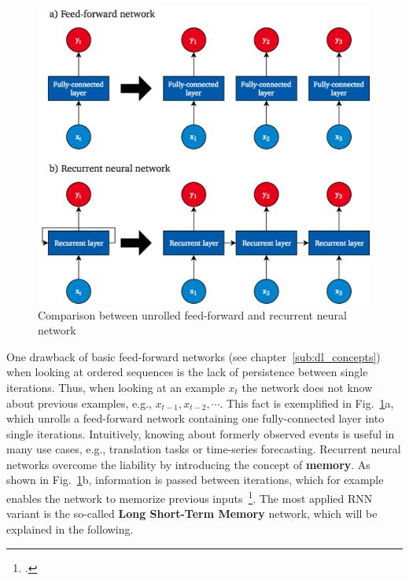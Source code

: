 \begin{figure}[h]
  \includegraphics[height=10cm]{img/rnn_unrolled_2}
  \caption{Comparison between unrolled feed-forward and recurrent neural network}
\label{fig:rnn_unrolled}
\end{figure}

One drawback of basic feed-forward networks (see chapter~\ref{sub:dl_concepts})
when looking at ordered sequences is the lack of persistence between single
iterations.
Thus, when looking at an example $x_t$ the network does not know about previous
examples, e.g., $x_{t-1}, x_{t-2},\cdots$.
This fact is exemplified in Fig.~\ref{fig:rnn_unrolled}a, which unrolls a
feed-forward network containing one fully-connected layer into single iterations.
Intuitively, knowing about formerly observed events is useful in many use cases,
e.g., translation tasks or time-series forecasting.
Recurrent neural networks overcome the liability by introducing the concept
of \textbf{memory}.
As shown in Fig.~\ref{fig:rnn_unrolled}b, information is passed between
iterations, which for example enables the network to memorize previous inputs~\footcite{Goodfellow2016}.
The most applied RNN variant is the so-called \textbf{Long Short-Term Memory}
network, which will be explained in the following.

